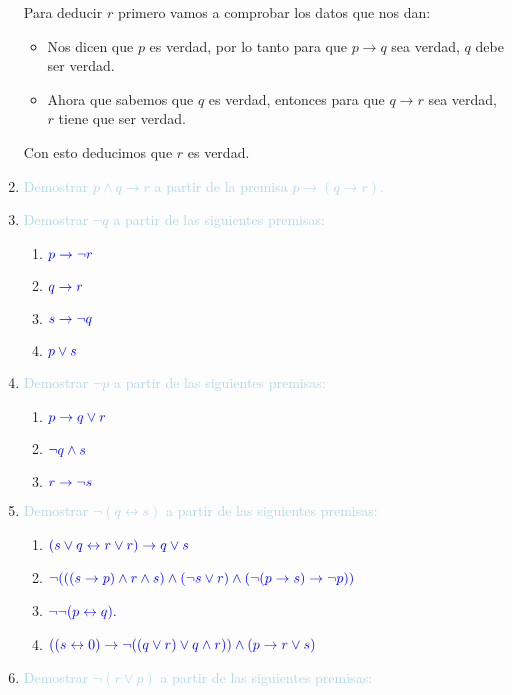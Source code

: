 \documentclass[12pt]{article}
\newcommand{\lb}[1]{\textcolor{lightblue}{#1}}
\newcommand{\db}[1]{\textcolor{blue}{#1}}
\begin{document}
\begin{enumerate}[label=\color{red}\textbf{\arabic*)}, leftmargin=*]
      Para deducir $r$ primero vamos a comprobar los datos que nos dan: 
      \begin{itemize}[label=$-$]
      \item Nos dicen que $p$ es verdad, por lo tanto para que $p\longrightarrow q$ sea verdad, $q$ debe ser verdad.
      \item Ahora que sabemos que $q$ es verdad, entonces para que $q\longrightarrow r$ sea verdad, $r$ tiene que ser verdad.
      \end{itemize}
      Con esto deducimos que $r$ es verdad.
      \item \lb{Demostrar $p\wedge q\to r$ a partir de la premisa $p\to(q\to r)$.}
      \item \lb{Demostrar $\neg q$ a partir de las siguientes premisas:}
      \begin{enumerate}[label=\color{red}\alph*)]
            \item $\db{p\to\neg r}$
            \item $\db{q\to r}$
            \item $\db{s\to\neg q}$
            \item $\db{p\vee s}$
      \end{enumerate}
      \item \lb{Demostrar $\neg p$ a partir de las siguientes premisas:}
      \begin{enumerate}[label=\color{red}\alph*)]
            \item $\db{p\to q\vee r}$
            \item $\db{\neg q\wedge s}$
            \item $\db{r\to\neg s}$
      \end{enumerate}
      \item \lb{Demostrar $\neg(q\leftrightarrow s)$ a partir de las siguientes premisas:}
      \begin{enumerate}[label=\color{red}\alph*)]
            \item $\db{(s\vee q\leftrightarrow r\vee r)\to q\vee s}$
            \item $\db{\neg(((s\to p)\wedge r\wedge s)\wedge(\neg s\vee r)\wedge(\neg(p\to s)\to\neg p))}$
            \item $\db{\neg\neg(p\leftrightarrow q).}$
            \item $\db{((s\leftrightarrow 0)\to\neg((q\vee r)\vee q\wedge r))\wedge(p\to r\vee s)}$
      \end{enumerate}
      \item \lb{Demostrar $\neg(r\vee p)$ a partir de las siguientes premisas:}

\end{enumerate}
\end{document}
